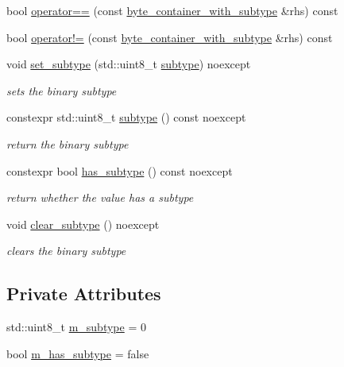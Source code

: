 \begin{DoxyCompactItemize}
\item 
bool \hyperlink{classnlohmann_1_1byte__container__with__subtype_a87c3145111f072121997835c00ffbd02}{operator==} (const \hyperlink{classnlohmann_1_1byte__container__with__subtype}{byte\+\_\+container\+\_\+with\+\_\+subtype} \&rhs) const 
\item 
bool \hyperlink{classnlohmann_1_1byte__container__with__subtype_a8213028e58c64392b4bcb1de74f2b4c5}{operator!=} (const \hyperlink{classnlohmann_1_1byte__container__with__subtype}{byte\+\_\+container\+\_\+with\+\_\+subtype} \&rhs) const 
\item 
void \hyperlink{classnlohmann_1_1byte__container__with__subtype_aa1653b01b420607b359a3e8815b516c2}{set\+\_\+subtype} (std\+::uint8\+\_\+t \hyperlink{classnlohmann_1_1byte__container__with__subtype_ac3ca9d09e55342f9588404e1dc2222f0}{subtype}) noexcept
\begin{DoxyCompactList}\small\item\em sets the binary subtype \end{DoxyCompactList}\item 
constexpr std\+::uint8\+\_\+t \hyperlink{classnlohmann_1_1byte__container__with__subtype_ac3ca9d09e55342f9588404e1dc2222f0}{subtype} () const noexcept
\begin{DoxyCompactList}\small\item\em return the binary subtype \end{DoxyCompactList}\item 
constexpr bool \hyperlink{classnlohmann_1_1byte__container__with__subtype_a9fc42fb07003bf7048c2f1fc79478e02}{has\+\_\+subtype} () const noexcept
\begin{DoxyCompactList}\small\item\em return whether the value has a subtype \end{DoxyCompactList}\item 
void \hyperlink{classnlohmann_1_1byte__container__with__subtype_a7b122b28ff2b8680557ca44ac9748e49}{clear\+\_\+subtype} () noexcept
\begin{DoxyCompactList}\small\item\em clears the binary subtype \end{DoxyCompactList}\end{DoxyCompactItemize}
\subsection*{Private Attributes}
\begin{DoxyCompactItemize}
\item 
std\+::uint8\+\_\+t \hyperlink{classnlohmann_1_1byte__container__with__subtype_ae36c8f29f4f50a00962b0e9110ba2756}{m\+\_\+subtype} = 0
\item 
bool \hyperlink{classnlohmann_1_1byte__container__with__subtype_a69aa7a914a7a31b61d3a9567d74ddf7b}{m\+\_\+has\+\_\+subtype} = false
\end{DoxyCompactItemize}


